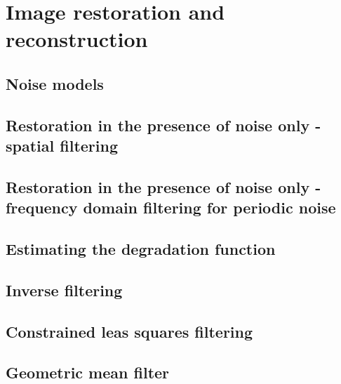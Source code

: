 \section{Image restoration and reconstruction}
\subsection{Noise models}

\subsection{Restoration in the presence of noise only - spatial filtering}


\subsection{Restoration in the presence of noise only - frequency domain filtering for periodic noise}


\subsection{Estimating the degradation function}


\subsection{Inverse filtering}


\subsection{Constrained leas squares filtering}


\subsection{Geometric mean filter}

